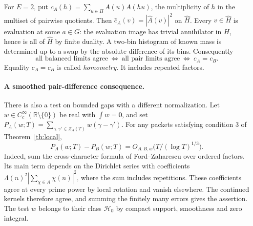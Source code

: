 \documentclass[11pt,letterpaper]{article}
\newcommand{\R}{\mathbb R}
\begin{document}
For $E=2$, put $c_A(h)=\sum_{u\in H} A(u)A(hu)$, the multiplicity of $h$ in the multiset of pairwise quotients. Then $\widehat c_A(v)=|\widehat A(v)|^2$ on $\widehat H$. Every $v\in\widehat H$ is evaluation at some $a\in G$: the evaluation image has trivial annihilator in $H$, hence is all of $\widehat H$ by finite duality. A two-bin histogram of known mass is determined up to a swap by the absolute difference of its bins. Consequently
\[
 \boxed{\ \text{all balanced limits agree}\ \Longleftrightarrow\
       \text{all pair limits agree}\ \Longleftrightarrow\ c_A=c_B.\ }
\]
Equality $c_A=c_B$ is called \emph{homometry}. It includes repeated factors.

\paragraph{A smoothed pair-difference consequence.}
There is also a test on bounded gaps with a different normalization. Let $w\in C_c^\infty(\R\setminus\{0\})$ be real with $\int w=0$, and set $P_A(w;T)=\sum_{\gamma,\gamma'\in Z_A(T)}w(\gamma-\gamma')$. For any packets satisfying condition 3 of Theorem~\ref{th:local},
\[
 P_A(w;T)-P_B(w;T)=O_{A,B,w}\bigl(T/(\log T)^{1/3}\bigr).
\]
Indeed, sum the cross-character formula of Ford--Zaharescu \cite[Theorem 2]{FZ} over ordered factors. Its main term depends on the Dirichlet series with coefficients $\Lambda(n)^2|\sum_{\chi\in A}\chi(n)|^2$, where the sum includes repetitions. These coefficients agree at every prime power by local rotation and vanish elsewhere. The continued kernels therefore agree, and summing the finitely many errors gives the assertion. The test $w$ belongs to their class $\mathcal H_0$ by compact support, smoothness and zero integral.


\newpage
\end{document}
